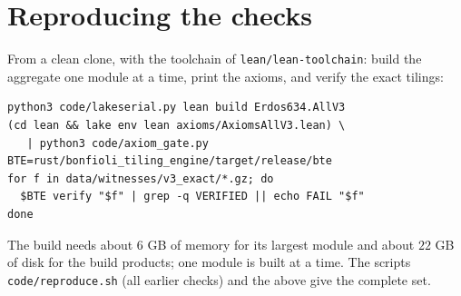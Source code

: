 \documentclass[11pt,reqno]{amsart}
\theoremstyle{plain}
\theoremstyle{definition}
\begin{document}
\section{Reproducing the checks}\label{app:repro}
From a clean clone, with the toolchain of \texttt{lean/lean-toolchain}: build the aggregate one module at a time, print the axioms, and verify the exact tilings:
\begin{verbatim}
python3 code/lakeserial.py lean build Erdos634.AllV3
(cd lean && lake env lean axioms/AxiomsAllV3.lean) \
   | python3 code/axiom_gate.py
BTE=rust/bonfioli_tiling_engine/target/release/bte
for f in data/witnesses/v3_exact/*.gz; do
  $BTE verify "$f" | grep -q VERIFIED || echo FAIL "$f"
done
\end{verbatim}
The build needs about $6$ GB of memory for its largest module and about $22$ GB of disk for the build products; one module is built at a time. The scripts \texttt{code/reproduce.sh} (all earlier checks) and the above give the complete set.
\end{document}
